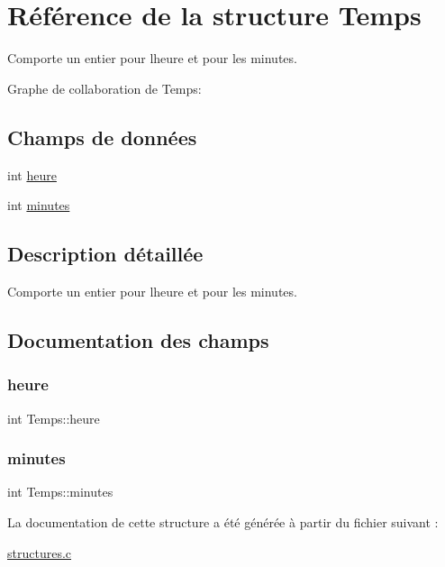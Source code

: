 \hypertarget{structTemps}{}\section{Référence de la structure Temps}
\label{structTemps}


Comporte un entier pour l\textquotesingle{}heure et pour les minutes.  




Graphe de collaboration de Temps\+:
\subsection*{Champs de données}
\begin{DoxyCompactItemize}
\item 
int \hyperlink{structTemps_a3b77d8e35f34055ca678df0fd98c94a8}{heure}
\item 
int \hyperlink{structTemps_af8421b5894d8edcb6e35956c48a7c8a8}{minutes}
\end{DoxyCompactItemize}


\subsection{Description détaillée}
Comporte un entier pour l\textquotesingle{}heure et pour les minutes. 

\subsection{Documentation des champs}
\mbox{\label{structTemps_a3b77d8e35f34055ca678df0fd98c94a8}} 
\subsubsection{\texorpdfstring{heure}{heure}}
{\footnotesize\ttfamily int Temps\+::heure}

\mbox{\label{structTemps_af8421b5894d8edcb6e35956c48a7c8a8}} 
\subsubsection{\texorpdfstring{minutes}{minutes}}
{\footnotesize\ttfamily int Temps\+::minutes}



La documentation de cette structure a été générée à partir du fichier suivant \+:\begin{DoxyCompactItemize}
\item 
\hyperlink{structures_8c}{structures.\+c}\end{DoxyCompactItemize}
